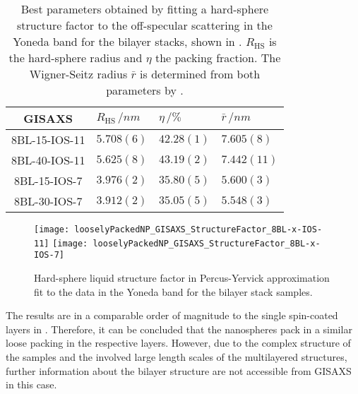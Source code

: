 \documentclass[\main/dresen_thesis.tex]{subfiles}
\begin{document}
  \begin{table}[tb]
    \centering
    \caption{\label{tab:looselyPackedNP:bilayerStacks:gisaxs}Best parameters obtained by fitting a hard-sphere structure factor to the off-specular scattering in the Yoneda band for the bilayer stacks, shown in . $R_\mathrm{HS}$ is the hard-sphere radius and $\eta$ the packing fraction. The Wigner-Seitz radius $\bar{r}$ is determined from both parameters by .}
    \begin{tabular}{ c | l | l | l}
      \rule{0pt}{2ex} \textbf{GISAXS}  & $R_\mathrm{HS} \, / \unit{nm}$ &$\eta \, / \unit{\%}$ & $\bar{r} \, / \unit{nm}$ \\
      \hline
      \rule{0pt}{2ex} 8BL-15-IOS-11    & $5.708(6)$    & $42.28(1)$ & $7.605(8)$\\
      \rule{0pt}{2ex} 8BL-40-IOS-11    & $5.625(8)$    & $43.19(2)$ & $7.442(11)$\\
      \rule{0pt}{2ex} 8BL-15-IOS-7     & $3.976(2)$    & $35.80(5)$ & $5.600(3)$\\
      \rule{0pt}{2ex} 8BL-30-IOS-7     & $3.912(2)$    & $35.05(5)$ & $5.548(3)$\\
      \hline
    \end{tabular}
  \end{table}

  \begin{figure}[tb]
    \centering
    \texttt{[image: looselyPackedNP\_GISAXS\_StructureFactor\_8BL-x-IOS-11]}
    \texttt{[image: looselyPackedNP\_GISAXS\_StructureFactor\_8BL-x-IOS-7]}
    \caption{\label{fig:looselyPackedNP:bilayerStacks:gisaxsHardSphereSF}Hard-sphere liquid structure factor in Percus-Yervick approximation fit to the data in the Yoneda band for the bilayer stack samples.}
  \end{figure}

  The results are in a comparable order of magnitude to the single spin-coated layers in .
  Therefore, it can be concluded that the nanospheres pack in a similar loose packing in the respective layers.
  However, due to the complex structure of the samples and the involved large length scales of the multilayered structures, further information about the bilayer structure are not accessible from GISAXS in this case.
\end{document}
